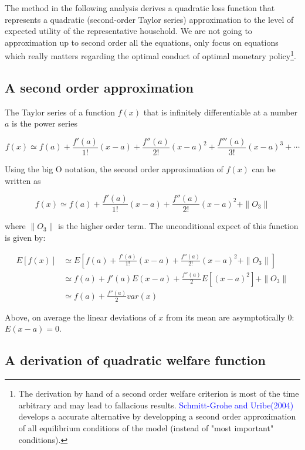 \documentclass[10pt,math=newtx,citestyle=gb7714-2015,bibstyle=gb7714-2015]{elegantbook}
\begin{document}
{	The method in the following analysis derives a quadratic loss function that represents a quadratic (second-order Taylor series) approximation to the level of expected utility of the representative household. We are not going to approximation up to second order all the equations, only focus on equations which really matters regarding the optimal conduct of optimal monetary policy\footnote{The derivation by hand of a second order welfare criterion is most of the time arbitrary and may lead to fallacious results. \textcolor{blue}{Schmitt-Grohe and Uribe(2004)} develops a accurate alternative by developping a second order approximation of all equilibrium conditions of the model (instead of "most important" conditions).}.
	
	\subsection{A second order approximation}
	
	The Taylor series of a function $f(x)$ that is infinitely differentiable at a number $a$ is the power series
	
	$$f(x)\simeq f(a)+ \frac{f'(a)}{1!}(x-a)+\frac{f''(a)}{2!}(x-a)^2+\frac{f'''(a)}{3!}(x-a)^3+\cdots$$
	
	Using the big O notation, the second order approximation of $f(x)$ can be written as
	
	$$f(x)\simeq f(a)+ \frac{f'(a)}{1!}(x-a)+\frac{f''(a)}{2!}(x-a)^2+\parallel O_3\parallel$$
	
	where $\parallel O_3\parallel$ is the higher order term. The unconditional expect of this function is given by:
	
	\begin{equation*}
		\begin{split}
			E[f(x)] &\simeq E\left[f(a)+ \frac{f'(a)}{1!}(x-a)+\frac{f''(a)}{2!}(x-a)^2+\parallel O_3\parallel\right]\\
			&\simeq f(a)+f'(a)E(x-a)+\frac{f''(a)}{2}E[(x-a)^2]+\parallel O_3\parallel\\
			&\simeq f(a)+\frac{f''(a)}{2}var(x)
		\end{split}
	\end{equation*}
	
	Above, on average the linear deviations of $x$ from its mean are asymptotically 0: $E(x-a)=0$.
	
	\subsection{A derivation of quadratic welfare function}
	
}
\end{document}
